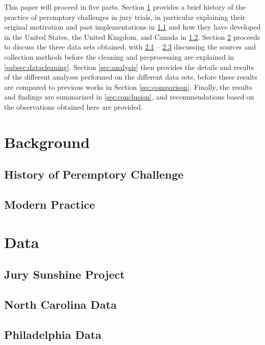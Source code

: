 \documentclass{article}
\begin{document}
This paper will proceed in five parts. Section \ref{sec:background} provides a brief history of the practice of peremptory
challenges in jury trials, in particular explaining their original motivation and past implementations in \ref{subsec:history} and
how they have developed in the United States, the United Kingdom, and Canada in \ref{subsec:modprac}. Section \ref{sec:data}
proceeds to discuss the three data sets obtained, with \ref{subsec:jspdata} -- \ref{subsec:phillydata} discussing the sources and
collection methods before the cleaning and preprocessing are explained in \ref{subsec:datacleaning}. Section \ref{sec:analysis}
then provides the details and results of the different analyses performed on the different data sets, before these results are
compared to previous works in Section \ref{sec:comparison}. Finally, the results and findings are summarized in
\ref{sec:conclusion}, and recommendations based on the observations obtained here are provided.

\section{Background} \label{sec:background}

\subsection{History of Peremptory Challenge} \label{subsec:history}

\subsection{Modern Practice} \label{subsec:modprac}

\section{Data} \label{sec:data}

\subsection{Jury Sunshine Project} \label{subsec:jspdata}

\subsection{North Carolina Data} \label{subsec:norcardata}

\subsection{Philadelphia Data} \label{subsec:phillydata}
\end{document}
